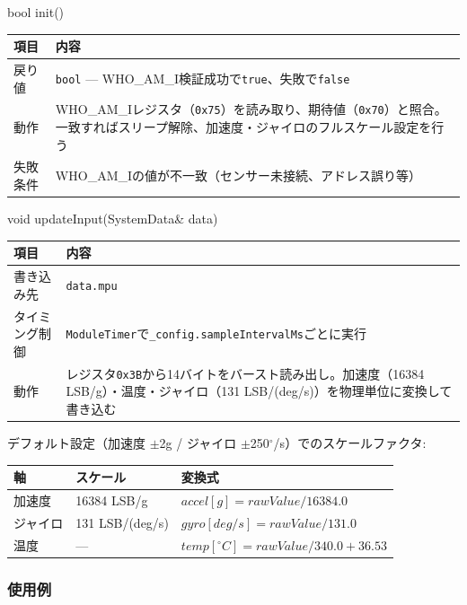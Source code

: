 \begin{funcblock}{bool init()}
\begin{tabularx}{\textwidth}{l X}
\toprule
\textbf{項目} & \textbf{内容} \\
\midrule
戻り値     & \texttt{bool} --- WHO\_AM\_I検証成功で\texttt{true}、失敗で\texttt{false} \\
動作       & WHO\_AM\_Iレジスタ（\texttt{0x75}）を読み取り、期待値（\texttt{0x70}）と照合。一致すればスリープ解除、加速度・ジャイロのフルスケール設定を行う \\
失敗条件   & WHO\_AM\_Iの値が不一致（センサー未接続、アドレス誤り等） \\
\bottomrule
\end{tabularx}
\end{funcblock}

\begin{funcblock}{void updateInput(SystemData\& data)}
\begin{tabularx}{\textwidth}{l X}
\toprule
\textbf{項目} & \textbf{内容} \\
\midrule
書き込み先     & \texttt{data.mpu} \\
タイミング制御 & \texttt{ModuleTimer}で\texttt{\_config.sampleIntervalMs}ごとに実行 \\
動作           & レジスタ\texttt{0x3B}から14バイトをバースト読み出し。加速度（16384 LSB/g）・温度・ジャイロ（131 LSB/(deg/s)）を物理単位に変換して書き込む \\
\bottomrule
\end{tabularx}
\end{funcblock}

\begin{notebox}[スケールファクタ]
デフォルト設定（加速度 $\pm$2g / ジャイロ $\pm$250$^{\circ}$/s）でのスケールファクタ:

\begin{tabularx}{\textwidth}{l l l}
\toprule
\textbf{軸} & \textbf{スケール} & \textbf{変換式} \\
\midrule
加速度 & 16384 LSB/g          & $accel [g] = rawValue / 16384.0$ \\
ジャイロ & 131 LSB/(deg/s)    & $gyro [deg/s] = rawValue / 131.0$ \\
温度   & ---                   & $temp [{}^{\circ}C] = rawValue / 340.0 + 36.53$ \\
\bottomrule
\end{tabularx}
\end{notebox}

\subsubsection{使用例}

